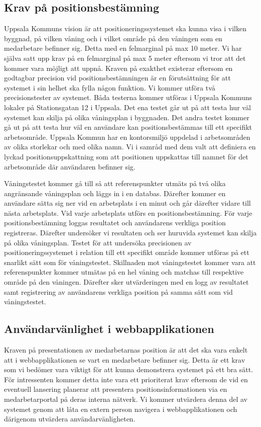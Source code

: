 \documentclass[a4paper,12pt]{article}
\begin{document}
 \subsection{Krav på positionsbestämning} \label{positionstest}
 Uppsala Kommuns vision är att positioneringssystemet ska kunna visa i vilken byggnad, på vilken våning och i vilket område på den våningen som en medarbetare befinner sig. Detta med en felmarginal på max 10 meter. Vi har själva satt upp krav på en felmarginal på max 5 meter eftersom vi tror att det kommer vara möjligt att uppnå. Kraven på exakthet existerar eftersom en godtagbar precision vid positionsbestämningen är en förutsättning för att systemet i sin helhet ska fylla någon funktion. Vi kommer utföra två precisionstester av systemet. Båda testerna kommer utföras i Uppsala Kommuns lokaler på Stationsgatan 12 i Uppsala. Det ena testet går ut på att testa hur väl systemet kan skilja på olika våningsplan i byggnaden. Det andra testet kommer gå ut på att testa hur väl en användare kan positionsbestämmas till ett specifikt arbetsområde. Uppsala Kommun har en kontorsmiljö uppdelad i arbetsområden av olika storlekar och med olika namn. Vi i samråd med dem valt att definiera en lyckad positionsuppskattning som att positionen uppskattas till namnet för det arbetsområde där användaren befinner sig.

 Våningstestet kommer gå till så att referenspunkter utmäts på två olika angränsande våningsplan och läggs in i en databas. Därefter kommer en användare sätta sig ner vid en arbetsplats i en minut och går därefter vidare till nästa arbetsplats. Vid varje arbetsplats utförs en positionsbestämning. För varje positionsbestämning loggas resultatet och användarens verkliga position registreras. Därefter undersöker vi resultaten och ser huruvida systemet kan skilja på olika våningsplan.
 Testet för att undersöka precisionen av positioneringssystemet i relation till ett specifikt område kommer utföras på ett snarlikt sätt som för våningstestet. Skillnaden mot våningstestet kommer vara att referenspunkter kommer utmätas på en hel våning och matchas till respektive område på den våningen. Därefter sker utvärderingen med en logg av resultatet samt registrering av användarens verkliga position på samma sätt som vid våningstestet.



 \subsection{Användarvänlighet i webbapplikationen}\label{krav_anv}
 Kraven på presentationen av medarbetarnas position är att det ska vara enkelt att i webbapplikationen se vart en medarbetare befinner sig. Detta är ett krav som vi bedömer vara viktigt för att kunna demonstrera systemet på ett bra sätt. För intressenten kommer detta inte vara ett prioriterat krav eftersom de vid en eventuell lansering planerar att presentera positionsinformationen via en medarbetarportal på deras interna nätverk. Vi kommer utvärdera denna del av systemet genom att låta en extern person navigera i webbapplikationen och därigenom utvärdera användarvänligheten.
\end{document}
